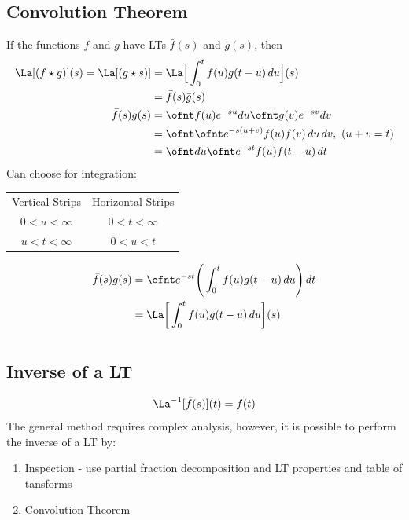 \documentclass[a4paper, 11pt, normalem]{report}
\begin{document}
\section{Convolution Theorem}
If the functions $f$ and $g$ have LTs $\bar{f}(s)$ and $\bar{g}(s)$, then
\begin{align*}
    \La[(f \star g)](s) = \La[(g \star s)] &= \La\Big[\int_{0}^{t} f(u)g(t - u)\,du \Big](s) \\
    &= \bar{f}(s)\bar{g}(s) \\
    \bar{f}(s)\bar{g}(s) &= \ofnt f(u)e^{-su}du \ofnt g(v)e^{-sv}dv \\
    &= \ofnt \ofnt e^{-s(u + v)}f(u)f(v)\, du\,dv,~ (u + v = t) \\
    &= \ofnt du \ofnt e^{-st}f(u)f(t - u)\,dt
\end{align*}
Can choose for integration:
\begin{tabular}{c|c}
    Vertical Strips & Horizontal Strips \\
    $0 < u < \infty$ & $0 < t < \infty$ \\
    $u < t < \infty$ & $0 < u < t$
\end{tabular}
\begin{align*}
    \bar{f}(s)\bar{g}(s) &= \ofnt e^{-st} \Bigg(\int_{0}^{t} f(u)g(t - u)\, du\Bigg)\,dt \\
    &= \La\bigg[\int_{0}^{t} f(u)g(t - u)\,du\bigg](s)
\end{align*}

\chapter{}
\section{Inverse of a LT}
\begin{equation*}
    \La^{-1}[\bar{f}(s)](t) = f(t)
\end{equation*}
The general method requires complex analysis, however, it is possible to perform the inverse of a LT by:
\begin{enumerate}
    \item Inspection - use partial fraction decomposition and LT properties and table of tansforms
    \item Convolution Theorem
\end{enumerate}
\end{document}
